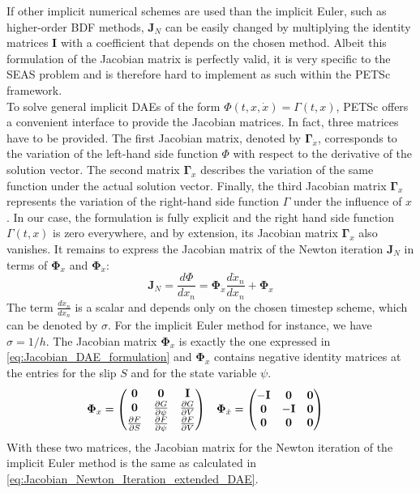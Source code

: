 If other implicit numerical schemes are used than the implicit Euler, such as higher-order BDF methods, $\mathbf{J}_N$ can be easily changed by multiplying the identity matrices $\mathbf{I}$ with a coefficient that depends on the chosen method. Albeit this formulation of the Jacobian matrix is perfectly valid, it is very specific to the SEAS problem and is therefore hard to implement as such within the PETSc framework. \\
To solve general implicit DAEs of the form $\Phi(t,x,\dot{x}) = \Gamma(t,x)$, PETSc offers a convenient interface to provide the Jacobian matrices. In fact, three matrices have to be provided. The first Jacobian matrix, denoted by $\bm{\Gamma}_{\dot{x}}$, corresponds to the variation of the left-hand side function $\Phi$ with respect to the derivative of the solution vector. The second matrix $\bm{\Gamma}_x$ describes the variation of the same function under the actual solution vector. Finally, the third Jacobian matrix $\bm{\Gamma}_x$ represents the variation of the right-hand side function $\Gamma$ under the influence of $x$. In our case, the formulation is fully explicit and the right hand side function $\Gamma(t,x)$ is zero everywhere, and by extension, its Jacobian matrix $\bm{\Gamma}_x$ also vanishes. It remains to express the Jacobian matrix of the Newton iteration $\mathbf{J}_N$ in terms of $\bm{\Phi}_x$ and $\bm{\Phi}_{\dot{x}}$:
\begin{equation}
\mathbf{J}_N = \frac{d\Phi}{dx_n} = \bm{\Phi}_{\dot{x}}\frac{d\dot{x}_n}{dx_n} + \bm{\Phi}_x	
\end{equation}
The term $\frac{d\dot{x}_n}{dx_n}$ is a scalar and depends only on the chosen timestep scheme, which can be denoted by $\sigma$. For the implicit Euler method for instance, we have $\sigma = 1/h$. The Jacobian matrix $\bm{\Phi}_x$ is exactly the one expressed in \autoref{eq:Jacobian_DAE_formulation} and $\bm{\Phi}_x$ contains negative identity matrices at the entries for the slip $S$ and for the state variable $\psi$.
\begin{align}
\bm{\Phi}_x = \begin{pmatrix} 
\mathbf{0}                     &  \mathbf{0}                       & 
\mathbf{I}                    \\ 
\mathbf{0}                     &  \pdv{G}{\psi} & 
\pdv{G}{V} \\ 
\pdv{F}{S}  &  \pdv{F}{\psi} &  
\pdv{F}{V} 
\end{pmatrix} &&&
\bm{\Phi}_{\dot{x}} = \begin{pmatrix} 
-\mathbf{I}  &  \mathbf{0}  & \mathbf{0} \\ 
\mathbf{0}  & -\mathbf{I}  & \mathbf{0} \\ 
\mathbf{0}  &  \mathbf{0}  & \mathbf{0}
\end{pmatrix}
\end{align}
With these two matrices, the Jacobian matrix for the Newton iteration of the implicit Euler method is the same as calculated in \autoref{eq:Jacobian_Newton_Iteration_extended_DAE}.



